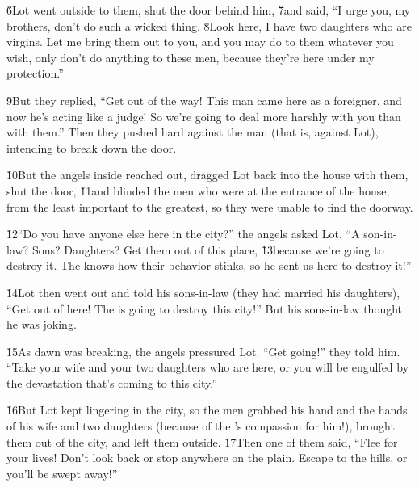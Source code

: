 \v{6}Lot went outside to them, shut the door behind him, \v{7}and said, ``I urge you, my brothers, don't do such a wicked thing. \v{8}Look here, I have two daughters who are virgins. Let me bring them out to you, and you may do to them whatever you wish, only don't do anything to these men, because they're here under my protection.''

\v{9}But they replied, ``Get out of the way! This man came here as a foreigner, and now he's acting like a judge! So we're going to deal more harshly with you than with them.'' Then they pushed hard against the man (that is, against Lot), intending to break down the door.

\v{10}But the angels inside reached out, dragged Lot back into the house with them, shut the door, \v{11}and blinded the men who were at the entrance of the house, from the least important to the greatest, so they were unable to find the doorway.

\v{12}``Do you have anyone else here in the city?'' the angels asked Lot. ``A son-in-law? Sons? Daughters? Get them out of this place, \v{13}because we're going to destroy it. The  knows how their behavior stinks, so he sent us here to destroy it!''

\v{14}Lot then went out and told his sons-in-law (they had married his daughters), ``Get out of here! The  is going to destroy this city!'' But his sons-in-law thought he was joking.

\v{15}As dawn was breaking, the angels pressured Lot. ``Get going!'' they told him. ``Take your wife and your two daughters who are here, or you will be engulfed by the devastation that's coming to this city.''

\v{16}But Lot kept lingering in the city, so the men grabbed his hand and the hands of his wife and two daughters (because of the 's compassion for him!), brought them out of the city, and left them outside. \v{17}Then one of them said, ``Flee for your lives! Don't look back or stop anywhere on the plain. Escape to the hills, or you'll be swept away!''

